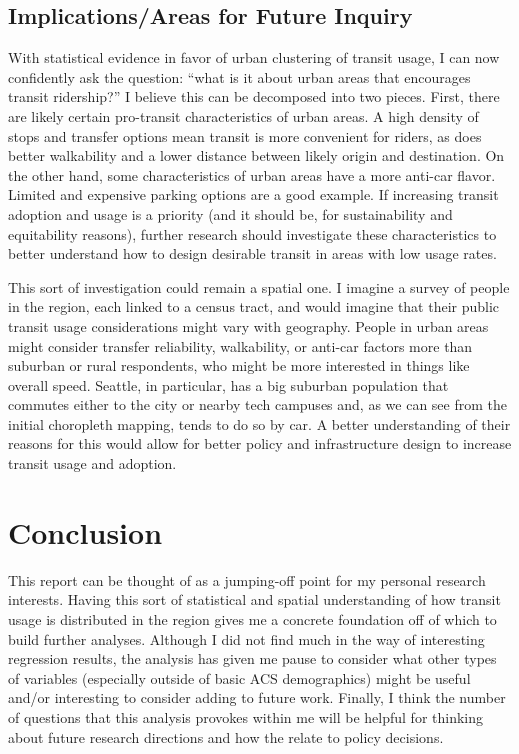 \documentclass[
]{article}
\begin{document}
\subsection{Implications/Areas for Future
Inquiry}\label{implicationsareas-for-future-inquiry}

With statistical evidence in favor of urban clustering of transit usage,
I can now confidently ask the question: ``what is it about urban areas
that encourages transit ridership?'' I believe this can be decomposed
into two pieces. First, there are likely certain pro-transit
characteristics of urban areas. A high density of stops and transfer
options mean transit is more convenient for riders, as does better
walkability and a lower distance between likely origin and destination.
On the other hand, some characteristics of urban areas have a more
anti-car flavor. Limited and expensive parking options are a good
example. If increasing transit adoption and usage is a priority (and it
should be, for sustainability and equitability reasons), further
research should investigate these characteristics to better understand
how to design desirable transit in areas with low usage rates.

This sort of investigation could remain a spatial one. I imagine a
survey of people in the region, each linked to a census tract, and would
imagine that their public transit usage considerations might vary with
geography. People in urban areas might consider transfer reliability,
walkability, or anti-car factors more than suburban or rural
respondents, who might be more interested in things like overall speed.
Seattle, in particular, has a big suburban population that commutes
either to the city or nearby tech campuses and, as we can see from the
initial choropleth mapping, tends to do so by car. A better
understanding of their reasons for this would allow for better policy
and infrastructure design to increase transit usage and adoption.

\section{Conclusion}\label{conclusion}

This report can be thought of as a jumping-off point for my personal
research interests. Having this sort of statistical and spatial
understanding of how transit usage is distributed in the region gives me
a concrete foundation off of which to build further analyses. Although I
did not find much in the way of interesting regression results, the
analysis has given me pause to consider what other types of variables
(especially outside of basic ACS demographics) might be useful and/or
interesting to consider adding to future work. Finally, I think the
number of questions that this analysis provokes within me will be
helpful for thinking about future research directions and how the relate
to policy decisions.
\end{document}
